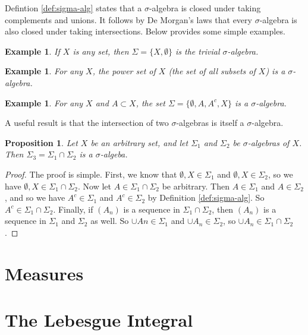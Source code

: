 \documentclass{article}
\newtheorem{proposition}[theorem]{Proposition}
\newtheorem{example}[theorem]{Example}
\begin{document}
Defintion \ref{def:sigma-alg} states that a $\sigma$-algebra is closed under
taking complements and unions. It follows by De Morgan's laws that every
$\sigma$-algebra is also closed under taking intersections. Below provides some
simple examples.

\begin{example}
    If $X$ is any set, then $\Sigma = \{ X, \emptyset \}$ is the trivial
    $\sigma$-algebra.
\end{example}

\begin{example}
    For any $X$, the power set of $X$ (the set of all subsets of $X$) is a
    $\sigma$-algebra.
\end{example}

\begin{example}
    For any $X$ and $A \subset X$, the set $\Sigma = \{\emptyset, A, A^c, X \}$
    is a $\sigma$-algebra.
\end{example}


A useful result is that the intersection of two $\sigma$-algebras is itself a
$\sigma$-algebra.

\begin{proposition}\label{prop:intersection-sig-alg}
    Let $X$ be an arbitrary set, and let $\Sigma_1$ and $\Sigma_2$ be
    $\sigma$-algebras of $X$. Then $\Sigma_3 = \Sigma_1 \cap \Sigma_2$ is a $\sigma$-algeba.
\end{proposition}

\begin{proof}
    The proof is simple. First, we know that $\emptyset, X \in \Sigma_1$ and
    $\emptyset, X \in \Sigma_2$, so we have $\emptyset, X \in \Sigma_1 \cap
    \Sigma_2$. Now let $A \in \Sigma_1 \cap \Sigma_2$ be arbitrary. Then $A \in
    \Sigma_1$ and $A \in \Sigma_2$, and so we have $A^c \in \Sigma_1$ and $A^c
    \in \Sigma_2$ by Definition \ref{def:sigma-alg}. So $A^c \in \Sigma_1 \cap
    \Sigma_2$. Finally, if $(A_n)$ is a sequence in $\Sigma_1 \cap \Sigma_2$,
    then $(A_n)$ is a sequence in $\Sigma_1$ and $\Sigma_2$ as well. So $\cup An
    \in \Sigma_1$ and $\cup A_n \in \Sigma_2$, so $\cup A_n \in \Sigma_1 \cap \Sigma_2$.
\end{proof}

\section{Measures}

\section{The Lebesgue Integral}
\end{document}
